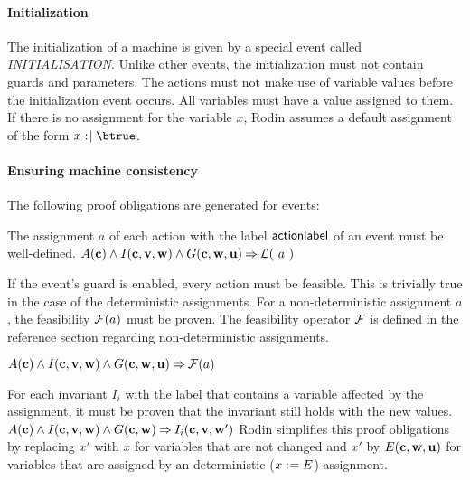 \paragraph{Initialization}
The initialization of a machine is given by a special event called \textsl{INITIALISATION}.
Unlike other events, the initialization must not contain guards and parameters.
The actions must not make use of variable values before the initialization event occurs.
All variables must have a value assigned to them. If there is no assignment for the variable $x$, Rodin assumes a default assignment of the form $x\bcmsuch \btrue$.

\paragraph{Ensuring machine consistency}
\label{consistency_proof_obligations}
The following proof obligations are generated for events:

The assignment $a$ of each action with the label $\textsf{actionlabel}$ of an event must be well-defined.
  {}%
  {$A(\allconstants) \land I(\allconstants,\allvariables) \land G(\allconstants,\concvariables,\concparameters) \limp %
    \wdl(~a~)$}
  
If the event's guard is enabled, every action must be feasible.
  This is trivially true in the case of the deterministic assignments.
  For a non-deterministic assignment $a$, the feasibility $\mathcal{F}(a)$ must be proven.
  The feasibility operator $\mathcal{F}$ is defined in the reference
  section regarding non-deterministic assignments.
  
  {$A(\mathbf{c}) \land I(\mathbf{c},{\mathbf{v},\mathbf{w}}) \land G(\mathbf{c},\mathbf{w},\mathbf{u}) \mathbin\Rightarrow \mathcal{F}(a)$}

For each invariant $I_i$ with the label  
  that contains a variable affected by the assignment, it must be proven
  that the invariant still holds with the new values.
  {}%
  {$A(\mathbf{c}) \land I(\mathbf{c},{\mathbf{v},\mathbf{w}}) \land G(\mathbf{c},\mathbf{w}) \mathbin\Rightarrow I_i(\mathbf{c},{\mathbf{v},\mathbf{w}}')$}
  Rodin simplifies this proof obligations by replacing $x'$ with $x$ for variables that are not
  changed and $x'$ by $E(\mathbf{c},\mathbf{w},\mathbf{u})$ 
  for variables that are assigned by an deterministic ($x \mathrel{:\mkern1mu=} E$) assignment.

